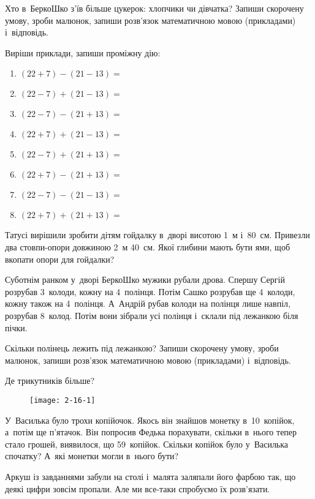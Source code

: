 Хто в~БеркоШко з’їв більше цукерок: хлопчики чи дівчатка?
Запиши скорочену умову, зроби малюнок, запиши розв’язок
математичною мовою (прикладами) і~відповідь.


\problem
Виріши приклади, запиши проміжну дію:
\begin{multicols}{2}
    \begin{enumerate}
        \item $(22 + 7) - (21 - 13) =$
        \item $(22 - 7) + (21 - 13) =$
        \item $(22 - 7) - (21 + 13) =$
        \item $(22 + 7) + (21 - 13) =$
        \item $(22 - 7) + (21 + 13) =$
        \item $(22 + 7) - (21 + 13) =$
        \item $(22 - 7) - (21 - 13) =$
        \item $(22 + 7) + (21 + 13) =$
    \end{enumerate}
\end{multicols}


\problem
Татусі вирішили зробити дітям гойдалку в~дворі висотою 1~м і~80~см.
Привезли два стовпи-опори довжиною 2~м 40~см.
Якої глибини мають бути ями, щоб вкопати опори для гойдалки?


\problem
Суботнім ранком у~дворі БеркоШко мужики рубали дрова.
Спершу Сергій розрубав 3~колоди, кожну на 4~полінця.
Потім Сашко розрубав ще 4~колоди, кожну також на 4~полінця.
А~Андрій рубав колоди на полінця лише навпіл, розрубав 8~колод.
Потім вони зібрали усі полінця і~склали під лежанкою біля пічки.

Скільки полінець лежить під лежанкою?
Запиши скорочену умову, зроби малюнок,
запиши розв’язок математичною мовою (прикладами) і~відповідь.


\problem
Де трикутників більше?

\begin{figure}[h]
    \centering
    \texttt{[image: 2-16-1]}
\end{figure}


\problem
У~Василька було трохи копійочок.
Якось він знайшов монетку в~10~копійок, а~потім ще п’ятачок.
Він попросив Федька порахувати, скільки в~нього тепер стало грошей,
виявилося, що 59~копійок.
Скільки копійок було у~Василька спочатку?
А~які монетки могли в~нього бути?


\problem
Аркуш із завданнями забули на столі і~малята заляпали його фарбою так,
що деякі цифри зовсім пропали.
Але ми все-таки спробуємо їх розв’язати.

